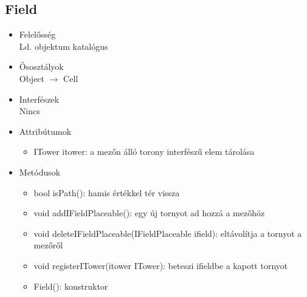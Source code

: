 \subsection{Field}
\begin{itemize}
\item Felelősség\\
Ld. objektum katalógus
\item Ősosztályok\\
Object $\rightarrow$ Cell
\item Interfészek\\
Nincs
\item Attribútumok
	\begin{itemize}
		\item ITower itower: a mezőn álló torony interfészű elem tárolása

		
	\end{itemize}
\item Metódusok
	\begin{itemize}
		
		\item bool isPath(): hamis értékkel tér vissza
		\item void addIFieldPlaceable(): egy új tornyot ad hozzá a mezőhöz
		\item void deleteIFieldPlaceable(IFieldPlaceable ifield): eltávolítja a tornyot a mezőről
		\item void registerITower(itower ITower): beteszi ifieldbe a kapott tornyot
		\item Field(): konstruktor
		
		
	\end{itemize}
\end{itemize}



